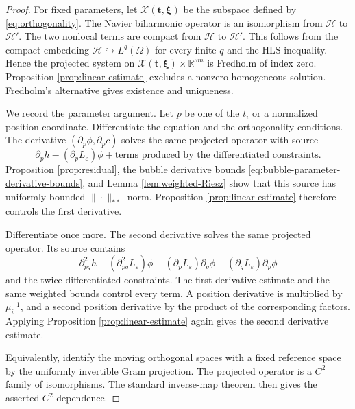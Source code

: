 \documentclass[11pt]{article}
\numberwithin{equation}{section}
\begin{document}
\begin{proof}
For fixed parameters, let $\mathcal X(\boldsymbol t,\boldsymbol\xi)$
be the subspace defined by \eqref{eq:orthogonality}. The Navier
biharmonic operator is an isomorphism from $\mathcal H$ to
$\mathcal H'$. The two nonlocal terms are compact from $\mathcal H$
to $\mathcal H'$. This follows from the compact embedding
$\mathcal H\hookrightarrow L^q(\Omega)$ for every finite $q$ and
the HLS inequality. Hence the projected system on
$\mathcal X(\boldsymbol t,\boldsymbol\xi)\times\mathbb R^{5m}$ is
Fredholm of index zero. Proposition \ref{prop:linear-estimate}
excludes a nonzero homogeneous solution. Fredholm's alternative gives
existence and uniqueness.

We record the parameter argument. Let $p$ be one of the $t_i$ or a
normalized position coordinate. Differentiate the equation and the
orthogonality conditions. The derivative $(\partial_p\phi,
\partial_pc)$ solves the same projected operator with source
\begin{equation*}
\partial_ph-(\partial_pL_\varepsilon)\phi
+\text{terms produced by the differentiated constraints}.
\end{equation*}
Proposition \ref{prop:residual}, the bubble derivative bounds
\eqref{eq:bubble-parameter-derivative-bounds}, and Lemma
\ref{lem:weighted-Riesz} show that this source has uniformly bounded
$\|\cdot\|_{**}$ norm. Proposition
\ref{prop:linear-estimate} therefore controls the first derivative.

Differentiate once more. The second derivative solves the same
projected operator. Its source contains
\begin{equation*}
\partial_{pq}^2h
-(\partial_{pq}^2L_\varepsilon)\phi
-(\partial_pL_\varepsilon)\partial_q\phi
-(\partial_qL_\varepsilon)\partial_p\phi
\end{equation*}
and the twice differentiated constraints. The first-derivative
estimate and the same weighted bounds control every term. A position
derivative is multiplied by $\mu_i^{-1}$, and a second position
derivative by the product of the corresponding factors. Applying
Proposition \ref{prop:linear-estimate} again gives the second
derivative estimate.

Equivalently, identify the moving orthogonal spaces with a fixed
reference space by the uniformly invertible Gram projection. The
projected operator is a $C^2$ family of isomorphisms. The standard
inverse-map theorem then gives the asserted $C^2$ dependence.
\end{proof}
\end{document}
